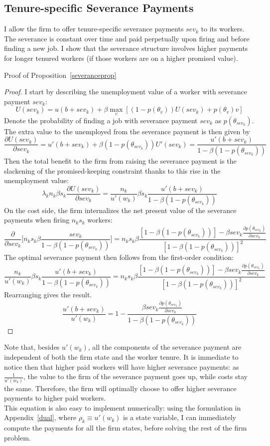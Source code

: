 \subsection{Tenure-specific Severance Payments}
I allow the firm to offer tenure-specific severance payments $sev_k$ to its workers. The severance is constant over time and paid perpetually upon firing and before finding a new job. I show that the severance structure involves higher payments for longer tenured workers (if those workers are on a higher promised value). 

Proof of Proposition~\ref{severanceprop}
\begin{proof}
\label{proof:severance}
I start by describing the unemployment value of a worker with severance payment $sev_k$:
\[U(sev_k) = u(b+sev_k) + \beta \max_v[(1-p(\theta_v))U(sev_k)+p(\theta_v)v]\]
Denote the probability of finding a job with severance payment $sev_k$ as $p(\theta_{sev_k})$. The extra value to the unemployed from the severance payment is then given by
\[\frac{\partial U(sev_k)}{\partial sev_k} = u'(b+sev_k) + \beta (1-p(\theta_{sev_k}))U'(sev_k)=\frac{u'(b+sev_k)}{1-\beta(1-p(\theta_{sev_k}))}\]
Then the total benefit to the firm from raising the severance payment is the slackening of the promised-keeping constraint thanks to this rise in the unemployment value:
\[\lambda_k n_k \beta s_k \frac{\partial U(sev_k)}{\partial sev_k} = \frac{n_k}{u'(w_k)}\beta s_k \frac{u'(b+sev_k)}{1-\beta(1-p(\theta_{sev_k}))}\]
On the cost side, the firm internalizes the net present value of the severance payments when firing $n_ks_k$ workers:
\[\frac{\partial}{\partial sev_k}\Big[n_k s_k \beta \frac{sev_k}{1-\beta(1-p(\theta_{sev_k}))}\Big]=n_ks_k\beta \frac{[1-\beta(1-p(\theta_{sev_k}))]-\beta sev_k \frac{\partial p(\theta_{sev_k})}{\partial sev_k}}{[1-\beta(1-p(\theta_{sev_k}))]^2}\]
The optimal severance payment then follows from the first-order condition:
\[ \frac{n_k}{u'(w_k)}\beta s_k \frac{u'(b+sev_k)}{1-\beta(1-p(\theta_{sev_k}))} = n_ks_k\beta \frac{[1-\beta(1-p(\theta_{sev_k}))]-\beta sev_k \frac{\partial p(\theta_{sev_k})}{\partial sev_k}}{[1-\beta(1-p(\theta_{sev_k}))]^2}\]
Rearranging gives the result.
\[\frac{u'(b+sev_k)}{u'(w_k)}=1-\frac{\beta sev_k \frac{\partial p(\theta_{sev_k})}{\partial sev_k}}{1-\beta(1-p(\theta_{sev_k}))}\]
\end{proof}
Note that, besides $u'(w_k)$, all the components of the severance payment are independent of both the firm state and the worker tenure. 
It is immediate to notice then that higher paid workers will have higher severance payments: as $\frac{1}{u'(w_k)}$, the value to the firm of the severance payment goes up, while costs stay the same. Therefore, the firm will optimally choose to offer higher severance payments to higher paid workers. \\
This equation is also easy to implement numerically: using the formulation in Appendix~\ref{dual}, where $\rho_k\equiv u'(w_k)$ is a state variable, I can immediately compute the payments for all the firm states, before solving the rest of the firm problem.




